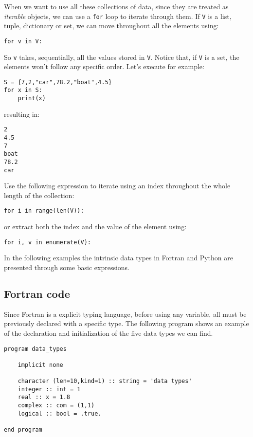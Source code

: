 \newpage
When we want to use all these collections of data, since they are treated as \textit{iterable} objects, we can use a \texttt{for} loop to iterate through them. 
If \texttt{V} is a list, tuple, dictionary or set, we can move throughout all the elements using:
\begin{verbatim}
for v in V:
\end{verbatim}
So \texttt{v} takes, sequentially, all the values stored in \texttt{V}. 
Notice that, if \texttt{V} is a set, the elements won't follow any specific order. 
Let's execute for example:
\begin{verbatim}
S = {7,2,"car",78.2,"boat",4.5}
for x in S:
    print(x)
\end{verbatim}
resulting in:
\begin{verbatim}
2
4.5
7
boat
78.2
car
\end{verbatim}
Use the following expression to iterate using an index throughout the whole length of the collection:
\begin{verbatim}
for i in range(len(V)): 
\end{verbatim}
or extract both the index and the value of the element using:
\begin{verbatim}
for i, v in enumerate(V):
\end{verbatim}




In the following examples the intrinsic data types in Fortran and Python are presented through some basic expressions. 


\newpage 
\subsection*{Fortran code}
Since Fortran is a explicit typing language, before using any variable, all must be previously declared with a specific type.
The following program shows an example of the declaration and initialization of the five data types we can find. 

\begin{verbatim}
program data_types
    
    implicit none
    
    character (len=10,kind=1) :: string = 'data types'
    integer :: int = 1
    real :: x = 1.8
    complex :: com = (1,1)
    logical :: bool = .true.
    
end program
\end{verbatim}




